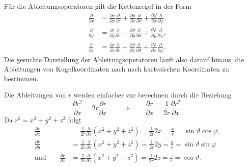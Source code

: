 Für die Ableitungsoperatoren gilt die Kettenregel in der Form
\begin{equation}
\begin{aligned}
\frac{\partial}{\partial x}
&=
\frac{\partial r}{\partial x}\frac{\partial}{\partial r}
+
\frac{\partial\vartheta}{\partial x}\frac{\partial}{\partial\vartheta}
+
\frac{\partial\varphi}{\partial x}\frac{\partial}{\partial\varphi},
\\
\frac{\partial}{\partial y}
&=
\frac{\partial r}{\partial y}\frac{\partial}{\partial r}
+
\frac{\partial\vartheta}{\partial y}\frac{\partial}{\partial\vartheta}
+
\frac{\partial\varphi}{\partial y}\frac{\partial}{\partial\varphi},
\\
\frac{\partial}{\partial z}
&=
\frac{\partial r}{\partial z}\frac{\partial}{\partial r}
+
\frac{\partial\vartheta}{\partial z}\frac{\partial}{\partial\vartheta}
+
\frac{\partial\varphi}{\partial z}\frac{\partial}{\partial\varphi}.
\end{aligned}
\label{skript:kugel:kettenregel}
\end{equation}
Die gesuchte Darstellung der Ableitungsoperatoren läuft also darauf
hinaus, die Ableitungen von Kugelkoordinaten nach nach kartesischen
Koordinaten zu bestimmen.

Die Ableitungen von $r$ werden einfacher zur berechnen durch die
Beziehung
\[
\frac{\partial r^2}{\partial x}
=
2r\frac{\partial r}{\partial x}
\qquad\Rightarrow\qquad
\frac{\partial r}{\partial x}
=\frac1{2r}\frac{\partial r^2}{\partial x}.
\]
Da $r^2=x^2+y^2+z^2$ folgt
\begin{equation}
\begin{aligned}
\frac{\partial r}{\partial x}
&=
\frac1{2r}\frac{\partial}{\partial x}(x^2+y^2+z^2)
=
\frac1{2r}2x
=
\frac{x}{r}
=
\sin\vartheta\cos\varphi,
\\
\frac{\partial r}{\partial y}
&=
\frac1{2r}\frac{\partial}{\partial x}(x^2+y^2+z^2)
=
\frac1{2r}2y
=
\frac{y}{r}
=
\sin\vartheta\sin\varphi
\\
\text{und}
\qquad
\frac{\partial r}{\partial z}
&=
\frac1{2r}\frac{\partial}{\partial z}(x^2+y^2+z^2)
=
\frac1{2r}2z
=
\frac{z}{r}
=
\cos\vartheta.
\end{aligned}
\label{skript:kugel:rableitungen}
\end{equation}

